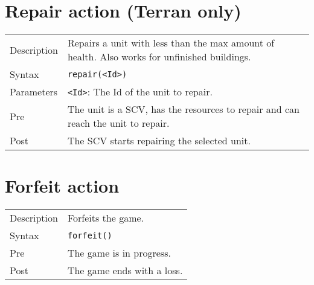 \section{Repair action (Terran only)}
\begin{tabularx}{\textwidth}{lX}
 Description & Repairs a unit with less than the max amount of health. Also works for unfinished buildings. \\
 Syntax & \verb|repair(<Id>)| \\
 Parameters & \verb|<Id>|: The Id of the unit to repair. \\
 Pre & The unit is a SCV, has the resources to repair and can reach the unit to repair. \\
 Post & The SCV starts repairing the selected unit.
\end{tabularx}

\section{Forfeit action}
\begin{tabularx}{\textwidth}{lX}
 Description & Forfeits the game. \\
 Syntax & \verb|forfeit()| \\
 Pre & The game is in progress. \\
 Post & The game ends with a loss.
\end{tabularx}
